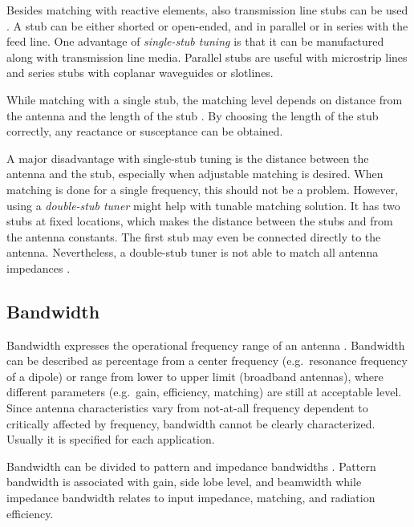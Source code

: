 Besides matching with reactive elements, also transmission line stubs can be used \cite{pozar}. A stub can be either shorted or open-ended, and in parallel or in series with the feed line. One advantage of \textit{single-stub tuning} is that it can be manufactured along with transmission line media. Parallel stubs are useful with microstrip lines and series stubs with coplanar waveguides or slotlines.

While matching with a single stub, the matching level depends on distance from the antenna and the length of the stub \cite{pozar}. By choosing the length of the stub correctly, any reactance or susceptance can be obtained.

A major disadvantage with single-stub tuning is the distance between the antenna and the stub, especially when adjustable matching is desired. When matching is done for a single frequency, this should not be a problem. However, using a \textit{double-stub tuner} might help with tunable matching solution. It has two stubs at fixed locations, which makes the distance between the stubs and from the antenna constants. The first stub may even be connected directly to the antenna. Nevertheless, a double-stub tuner is not able to match all antenna impedances \cite{pozar}.


\subsection{Bandwidth}
\label{sec:bandwidth}
Bandwidth expresses the operational frequency range of an antenna \cite{balanis}. Bandwidth can be described as percentage from a center frequency (e.g.\ resonance frequency of a dipole) or range from lower to upper limit (broadband antennas), where different parameters (e.g.\ gain, efficiency, matching) are still at acceptable level. Since antenna characteristics vary from not-at-all frequency dependent to critically affected by frequency, bandwidth cannot be clearly characterized. Usually it is specified for each application.

Bandwidth can be divided to pattern and impedance bandwidths \cite{balanis}. Pattern bandwidth is associated with gain, side lobe level, and beamwidth while impedance bandwidth relates to input impedance, matching, and radiation efficiency.

